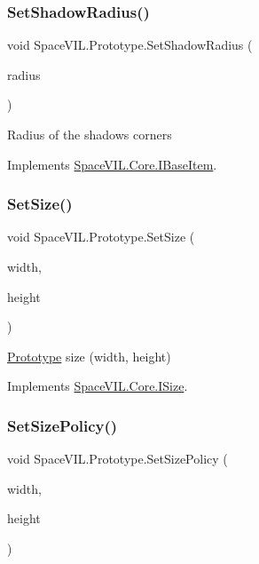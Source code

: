 \subsubsection{\texorpdfstring{Set\+Shadow\+Radius()}{SetShadowRadius()}}
{\footnotesize\ttfamily void Space\+V\+I\+L.\+Prototype.\+Set\+Shadow\+Radius (\begin{DoxyParamCaption}\item[{int}]{radius }\end{DoxyParamCaption})}



Radius of the shadows corners 



Implements \mbox{\hyperlink{interface_space_v_i_l_1_1_core_1_1_i_base_item}{Space\+V\+I\+L.\+Core.\+I\+Base\+Item}}.

\mbox{\label{class_space_v_i_l_1_1_prototype_a2f7301e72422245f5d0a72422cd48deb}} 
\subsubsection{\texorpdfstring{Set\+Size()}{SetSize()}}
{\footnotesize\ttfamily void Space\+V\+I\+L.\+Prototype.\+Set\+Size (\begin{DoxyParamCaption}\item[{int}]{width,  }\item[{int}]{height }\end{DoxyParamCaption})}



\mbox{\hyperlink{class_space_v_i_l_1_1_prototype}{Prototype}} size (width, height) 



Implements \mbox{\hyperlink{interface_space_v_i_l_1_1_core_1_1_i_size}{Space\+V\+I\+L.\+Core.\+I\+Size}}.

\mbox{\label{class_space_v_i_l_1_1_prototype_aef3665193fee08b031ad7401dafc8674}} 
\subsubsection{\texorpdfstring{Set\+Size\+Policy()}{SetSizePolicy()}}
{\footnotesize\ttfamily void Space\+V\+I\+L.\+Prototype.\+Set\+Size\+Policy (\begin{DoxyParamCaption}\item[{Size\+Policy}]{width,  }\item[{Size\+Policy}]{height }\end{DoxyParamCaption})}



